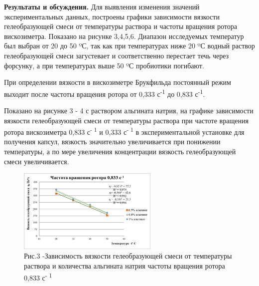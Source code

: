 \begin{multicols}{2}
{\bfseries Результаты и обсуждения.} Для выявления изменения значений
экспериментальных данных, построены графики зависимости вязкости
гелеобразующей смеси от температуры раствора и частоты вращения ротора
вискозиметра. Показано на рисунке 3,4,5,6. Диапазон исследуемых
температур был выбран от 20 до 50 ºС, так как при температурах ниже 20
ºС водный раствор гелеобразующей смеси загустевает и соответственно
перестает течь через форсунку, а при температурах выше 50 ºС пробиотики
погибают.

При определении вязкости в вискозиметре Брукфильда постоянный режим
выходит после частоты вращения ротора от 0,333 с\textsuperscript{-1} до
0,833 с\textsuperscript{-1}.

Показано на рисунке 3 - 4 с раствором альгината натрия, на графике
зависимости вязкости гелеобразующей смеси от температуры раствора при
частоте вращения ротора вискозиметра 0,833 с\textsuperscript{- 1} и
0,333 с\textsuperscript{- 1} в экспериментальной установке для получения
капсул, вязкость значительно увеличивается при понижении температуры, а
по мере увеличения концентрации вязкость гелеобразующей смеси
увеличивается.
\end{multicols}

\begin{figure}[H]
	\centering
	\includegraphics[width=0.6\textwidth]{assets/312}
	\caption*{Рис.3 -Зависимость вязкости гелеобразующей смеси от температуры
	раствора и количества альгината натрия частоты вращения ротора 0,833
	с\textsuperscript{- 1}}
\end{figure}


